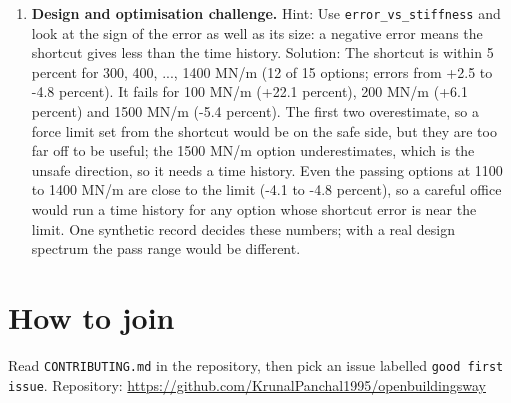 \documentclass[11pt,a4paper]{article}
\begin{document}
\begin{enumerate}[nosep]
\item \textbf{Design and optimisation challenge.} Hint: Use \texttt{error\_vs\_stiffness} and look at the sign of the error as well as its size: a negative error means the shortcut gives less than the time history. Solution: The shortcut is within 5 percent for 300, 400, ..., 1400 MN/m (12 of 15 options; errors from +2.5 to -4.8 percent). It fails for 100 MN/m (+22.1 percent), 200 MN/m (+6.1 percent) and 1500 MN/m (-5.4 percent). The first two overestimate, so a force limit set from the shortcut would be on the safe side, but they are too far off to be useful; the 1500 MN/m option underestimates, which is the unsafe direction, so it needs a time history. Even the passing options at 1100 to 1400 MN/m are close to the limit (-4.1 to -4.8 percent), so a careful office would run a time history for any option whose shortcut error is near the limit. One synthetic record decides these numbers; with a real design spectrum the pass range would be different.
\end{enumerate}

\section{How to join}
Read \texttt{CONTRIBUTING.md} in the repository, then pick an issue labelled \texttt{good first issue}. Repository: \url{https://github.com/KrunalPanchal1995/openbuildingsway}
\end{document}
